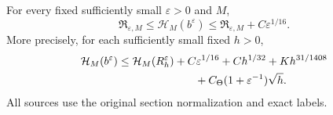 \begin{theorem}
\label{thm:v87-original-localization}
For every fixed sufficiently small $\varepsilon>0$ and $M$,
\begin{equation}\label{eq:v87-localization-sandwich}
 \mathfrak R_{\varepsilon,M}\le\mathcal H_M(b^\varepsilon)
          \le\mathfrak R_{\varepsilon,M}+C\varepsilon^{1/16}.
\end{equation}
More precisely, for each sufficiently small fixed $h>0$,
\begin{align}
 \mathcal H_M(b^\varepsilon)\le{}&
  \mathcal H_M(R_h^\varepsilon)+C\varepsilon^{1/16}
      +Ch^{1/32}+Kh^{31/1408}\notag\\
 &\hspace{20mm}+C_\Theta(1+\varepsilon^{-1})\sqrt h.
                                         \label{eq:v87-finite-width-source}
\end{align}
All sources use the original section normalization and exact labels.
\end{theorem}
